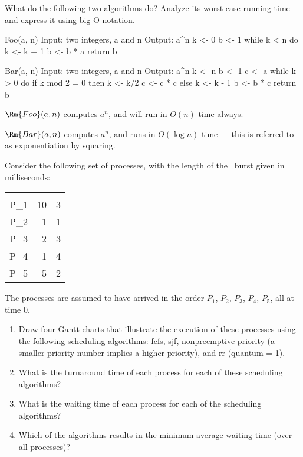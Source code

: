 \documentclass[
	gantt,
	scheme,
	assembly,
	math,
	pseudocode,
	tabu
]{brandeis-problemset}
\begin{document}
\begin{problem}
	What do the following two algorithms do? Analyze its worst-case
	running time and express it using big-O notation.

\begin{pseudocode}[Foo]
Foo(a, n)
	Input:  two integers, a and n
	Output: a^n
	k <- 0
	b <- 1
	while k < n do
		k <- k + 1
		b <- b * a
	return b
\end{pseudocode}

\begin{pseudocode}[Bar]
Bar(a, n)
	Input:  two integers, a and n
	Output: a^n
	k <- n
	b <- 1
	c <- a
	while k > 0 do
		if k mod 2 = 0 then
			k <- k/2
			c <- c * c
		else
			k <- k - 1
			b <- b * c
	return b
\end{pseudocode}

\end{problem}

$\Rm{Foo}(a, n)$ computes $a^n$, and will run in $O(n)$ time always.

$\Rm{Bar}(a, n)$  computes $a^n$, and runs in $O(\log n)$
time --- this is referred to as exponentiation by squaring.

\begin{problem}[number=5.4, part=Scheduling, label=schedule]
	Consider the following set of processes, with the length of the
	\cpu\ burst given in milliseconds:

	\begin{center}
		\begin{tabu} to 0.25\linewidth{X[1,$]rr}
		 &  &  \\
		P_1 & 10 & 3 \\
		P_2 & 1 & 1 \\
		P_3 & 2 & 3 \\
		P_4 & 1 & 4 \\
		P_5 & 5 & 2 \\
		\end{tabu}
	\end{center}%

	The processes are assumed to have arrived in the order $P_1$, $P_2$,
	$P_3$, $P_4$, $P_5$, all at time 0.

	\begin{enumerate}
		\item Draw four Gantt charts that illustrate the execution
			of these processes using the following scheduling
			algorithms: \ac{fcfs}, \ac{sjf}, nonpreemptive
			priority (a smaller priority number implies a higher
			priority), and \ac{rr} (quantum = 1).
		\item What is the turnaround time of each process for each
			of these scheduling algorithms?
		\item What is the waiting time of each process for each of
			the scheduling algorithms?
		\item Which of the algorithms results in the minimum average
			waiting time (over all processes)?
	\end{enumerate}
\end{problem}
\end{document}
